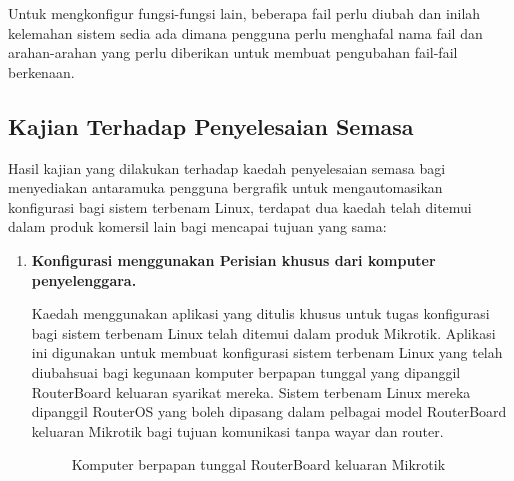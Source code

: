 Untuk mengkonfigur fungsi-fungsi lain, beberapa fail perlu diubah dan inilah kelemahan sistem sedia ada dimana pengguna perlu menghafal nama fail dan arahan-arahan yang perlu diberikan untuk membuat pengubahan fail-fail berkenaan.
       
\subsection{Kajian Terhadap Penyelesaian Semasa}
Hasil kajian yang dilakukan terhadap kaedah penyelesaian semasa bagi menyediakan antaramuka pengguna bergrafik untuk mengautomasikan konfigurasi bagi sistem terbenam Linux, terdapat dua kaedah telah ditemui dalam produk komersil lain bagi mencapai tujuan yang sama:
\begin{enumerate}
\item \textbf{Konfigurasi menggunakan Perisian khusus dari komputer penyelenggara.}

Kaedah menggunakan aplikasi yang ditulis khusus untuk tugas konfigurasi bagi sistem terbenam Linux telah ditemui dalam produk Mikrotik. Aplikasi ini digunakan untuk membuat konfigurasi sistem terbenam Linux yang telah diubahsuai bagi kegunaan komputer berpapan tunggal yang dipanggil RouterBoard keluaran syarikat mereka. Sistem terbenam Linux mereka dipanggil RouterOS yang boleh dipasang dalam pelbagai model RouterBoard keluaran Mikrotik bagi tujuan komunikasi tanpa wayar dan router.

\begin{figure}[!h]
\caption[Komputer berpapan tunggal RouterBoard keluaran Mikrotik]{Komputer berpapan tunggal RouterBoard keluaran Mikrotik}
\label{c2:f4}
\end{figure}


\end{enumerate}
